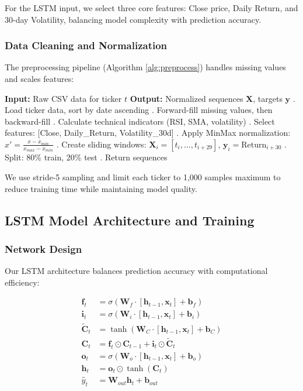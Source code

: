 \documentclass[conference]{IEEEtran}
\begin{document}
For the LSTM input, we select three core features: Close price, Daily Return, and 30-day Volatility, balancing model complexity with prediction accuracy.

\subsubsection{Data Cleaning and Normalization}
The preprocessing pipeline (Algorithm \ref{alg:preprocess}) handles missing values and scales features:

\begin{algorithmic}
\STATE \textbf{Input:} Raw CSV data for ticker $t$
\STATE \textbf{Output:} Normalized sequences $\mathbf{X}$, targets $\mathbf{y}$
\STATE
{}. Load ticker data, sort by date ascending
. Forward-fill missing values, then backward-fill
. Calculate technical indicators (RSI, SMA, volatility)
. Select features: [Close, Daily\_Return, Volatility\_30d]
. Apply MinMax normalization: $x' = \frac{x - x_{min}}{x_{max} - x_{min}}$
. Create sliding windows: $\mathbf{X}_i = [t_i, ..., t_{i+29}]$, $\mathbf{y}_i = \text{Return}_{i+30}$
. Split: 80\% train, 20\% test
. Return sequences
\end{algorithmic}

We use stride-5 sampling and limit each ticker to 1,000 samples maximum to reduce training time while maintaining model quality.

\subsection{LSTM Model Architecture and Training}

\subsubsection{Network Design}
Our LSTM architecture balances prediction accuracy with computational efficiency:

\begin{equation}
\begin{aligned}
\mathbf{f}_t &= \sigma(\mathbf{W}_f \cdot [\mathbf{h}_{t-1}, \mathbf{x}_t] + \mathbf{b}_f) \\
\mathbf{i}_t &= \sigma(\mathbf{W}_i \cdot [\mathbf{h}_{t-1}, \mathbf{x}_t] + \mathbf{b}_i) \\
\tilde{\mathbf{C}}_t &= \tanh(\mathbf{W}_C \cdot [\mathbf{h}_{t-1}, \mathbf{x}_t] + \mathbf{b}_C) \\
\mathbf{C}_t &= \mathbf{f}_t \odot \mathbf{C}_{t-1} + \mathbf{i}_t \odot \tilde{\mathbf{C}}_t \\
\mathbf{o}_t &= \sigma(\mathbf{W}_o \cdot [\mathbf{h}_{t-1}, \mathbf{x}_t] + \mathbf{b}_o) \\
\mathbf{h}_t &= \mathbf{o}_t \odot \tanh(\mathbf{C}_t) \\
\hat{y}_t &= \mathbf{W}_{out} \mathbf{h}_t + \mathbf{b}_{out}
\end{aligned}
\end{equation}
\end{document}
